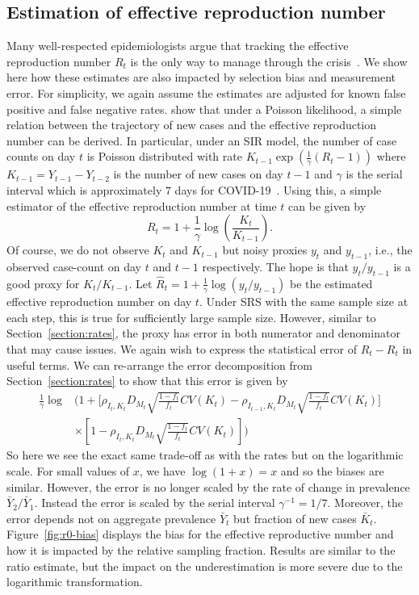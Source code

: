 \documentclass[aoas]{amsart}
\begin{document}
\subsection{Estimation of effective reproduction number}
\label{section:r0-estimation}
Many well-respected epidemiologists argue that tracking the effective reproduction number $R_t$ is the only way to manage through the crisis~\citep{Gabriel2020}.  We show here how these estimates are also impacted by selection bias and measurement error.  For simplicity, we again assume the estimates are adjusted for known false positive and false negative rates. \cite{Bettencourt2008} show that under a Poisson likelihood, a simple relation between the trajectory of new cases and the effective reproduction number can be derived.  In particular, under an SIR model, the number of case counts on day $t$ is Poisson distributed with rate $K_{t-1} \exp \left( \frac{1}{\gamma} (R_t - 1) \right)$ where $K_{t-1} = Y_{t-1}-Y_{t-2}$ is the number of new cases on day $t-1$ and $\gamma$ is the serial interval which is approximately $7$ days for COVID-19~\citep{Sanche2020}.  Using this, a simple estimator of the effective reproduction number at time $t$ can be given by
$$
R_t = 1 + \frac{1}{\gamma} \log \left( \frac{K_t}{K_{t-1}} \right).
$$
Of course, we do not observe $K_t$ and $K_{t-1}$ but noisy proxies $y_t$ and $y_{t-1}$, i.e., the observed case-count on day $t$ and $t-1$ respectively. The hope is that $y_t/y_{t-1}$ is a good proxy for $K_t/K_{t-1}$. Let $\hat R_t = 1 + \frac{1}{\gamma} \log \left( y_t / y_{t-1} \right)$ be the estimated effective reproduction number on day $t$.  Under SRS with the same sample size at each step, this is true for sufficiently large sample size.  However, similar to Section~\ref{section:rates}, the proxy has error in both numerator and denominator that may cause issues.  We again wish to express the statistical error of $\hat R_t - R_t$ in useful terms.  We can re-arrange the error decomposition from Section~\ref{section:rates} to show that this error is given by
$$
\begin{aligned}
\frac{1}{\gamma}\log &\bigg( 1 + \bigg[ \rho_{I_t,K_t} D_{M_t} \sqrt{\frac{1-f_t}{f_t}} CV (K_t)  -\rho_{I_{t-1},K_t} D_{M_t} \sqrt{\frac{1-f_t}{f_t}} CV (K_t) \bigg] \\
&\times \left[ 1 - \rho_{I_t,K_t} D_{M_t} \sqrt{\frac{1-f_t}{f_t}} CV (K_t) \right] \bigg)
\end{aligned}
$$
So here we see the exact same trade-off as with the rates but on the logarithmic scale.  For small values of $x$, we have $\log(1+x) = x$ and so the biases are similar.  However, the error is no longer scaled by the rate of change in prevalence $\bar Y_2/\bar Y_1$. Instead the error is scaled by the serial interval $\gamma^{-1} = 1/7$.  Moreover, the error depends not on aggregate prevalence $\bar Y_t$ but fraction of new cases $\bar K_t$. Figure~\ref{fig:r0-bias} displays the bias for the effective reproductive number and how it is impacted by the relative sampling fraction.  Results are similar to the ratio estimate, but the impact on the underestimation is more severe due to the logarithmic transformation.
\end{document}
